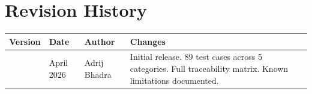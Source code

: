 \documentclass[12pt,a4paper]{report}
\begin{document}
\chapter*{Revision History}
\begin{longtable}{C{1.5cm} C{2cm} L{4cm} L{5cm}}
  \toprule
  \textbf{Version} & \textbf{Date} & \textbf{Author} & \textbf{Changes} \\
  \midrule
  \endhead
  \bottomrule
   & April 2026 & Adrij Bhadra &
    Initial release. 89 test cases across 5 categories. Full traceability
    matrix. Known limitations documented. \\
  \bottomrule
\end{longtable}
\end{document}
